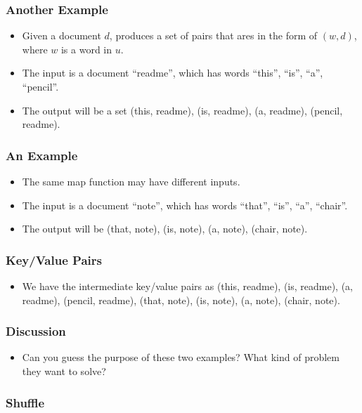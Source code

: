 \documentclass{beamer}
\begin{document}
\begin{frame}
  \frametitle{Another Example}
  \begin{itemize}
    \item Given a document $d$, produces a set of pairs that ares in
      the form of $(w, d)$, where $w$ is a word in $u$.
      \item The input is a document ``readme'', which has words
        ``this'', ``is'', ``a'', ``pencil''.
      \item The output will be a set (this, readme), (is,
        readme), (a, readme), (pencil, readme).
  \end{itemize}
\end{frame}

\begin{frame}
  \frametitle{An Example} 
  \begin{itemize}
    \item The same map function may have different inputs.
    \item The input is a document ``note'', which has words ``that'',
      ``is'', ``a'', ``chair''.
    \item The output will be (that, note), (is, note), (a,
      note), (chair, note).
  \end{itemize}
\end{frame}

\begin{frame}
  \frametitle{Key/Value Pairs}
  \begin{itemize}
    \item We have the intermediate key/value pairs as (this,
      readme), (is, readme), (a, readme), (pencil, readme), (that,
      note), (is, note), (a, note), (chair, note).
  \end{itemize}
\end{frame}

\begin{frame}
  \frametitle{Discussion}
  \begin{itemize}
    \item Can you guess the purpose of these two examples?  What kind
      of problem they want to solve?
  \end{itemize}
\end{frame}

\subsubsection{Shuffle}
\end{document}
